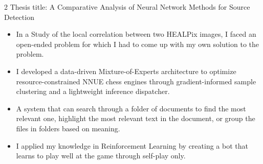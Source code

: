 \documentclass[10pt,a4paper,ragged2e,withhyper]{altacv}
\begin{document}
\begin{paracol}{2}
\divider
{}
Thesis title: A Comparative Analysis of Neural Network Methods for Source Detection

\divider
{}




\end{paracol}

\newpage



\begin{itemize}
\item In a Study of the local correlation between two HEALPix images, I faced an open-ended problem for which I had to come up with my own solution to the problem.
\end{itemize}

\divider

\begin{itemize}
\item I developed a data-driven Mixture-of-Experts architecture to optimize resource-constrained NNUE chess engines through gradient-informed sample clustering and a lightweight inference dispatcher.
\end{itemize}

\divider

\begin{itemize}
\item A system that can search through a folder of documents to find the most relevant one, highlight the most relevant text in the document, or group the files in folders based on meaning.
\end{itemize}

\divider

\begin{itemize}
\item I applied my knowledge in Reinforcement Learning by creating a bot that learns to play well at the game through self-play only.
\end{itemize}
\end{document}
